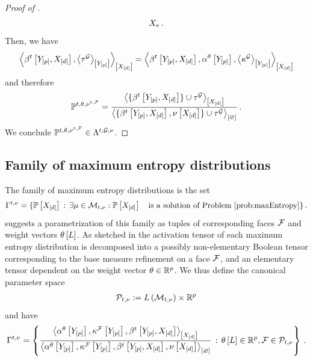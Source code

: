 \begin{proof}[Proof of ]
\begin{align*}
{        }{X_{e}} \, .
    \end{align*}
    Then, we have
    \begin{align*}
        \left\langle \beta^{t}\left[Y_{[p]},X_{[d]}\right],\left\langle \tau^{\mathcal{G}}\right\rangle_{\left[ Y_{[p]} \right]}\right\rangle_{\left[ X_{[d]} \right]}
        = \left\langle \beta^{t}\left[Y_{[p]},X_{[d]}\right],\alpha^\theta\left[Y_{[p]}\right],\left\langle \kappa^{\mathcal{G}}\right\rangle_{\left[ Y_{[p]} \right]}\right\rangle_{\left[ X_{[d]} \right]}
    \end{align*}
    and therefore
    \begin{align*}
        \mathbb{P}^{t,\theta,\nu^{t,\mathcal{F}}}
        = \frac{
            \left\langle \{\beta^{t}\left[Y_{[p]},X_{[d]}\right]\}\cup\tau^{\mathcal{G}}\right\rangle_{\left[ X_{[d]} \right]}
        }{
            \left\langle \{\beta^{t}\left[Y_{[p]},X_{[d]}\right],\nu\left[X_{[d]}\right]\}\cup\tau^{\mathcal{G}}\right\rangle_{\left[ \varnothing \right]}
        } \, .
    \end{align*}
    We conclude $\mathbb{P}^{t,\theta,\nu^{t,\mathcal{F}}}\in \Lambda^{t,\mathcal{G},\nu}$.
\end{proof}

\subsection{Family of maximum entropy distributions}


The family of maximum entropy distributions is the set
\begin{align*}
    \maxentfamilyof{\sstat}{\basemeasure} =
    \{\probwith \wcols \exists\meanparam\in\genmeanset : \probwith \quad\text{is a solution of \problemref{prob:maxEntropy}} \} \, .
\end{align*}
 suggests a parametrization of this family as tuples of corresponding faces $\mathcal{F}$ and weight vectors $\theta\left[L\right]$.
As sketched in  the activation tensor of each maximum entropy distribution is decomposed into a possibly non-elementary Boolean tensor corresponding to the base measure refinement on a face $\mathcal{F}$, and an elementary tensor dependent on the weight vector $\theta\in\mathbb{R}^{p}$.
We thus define the canonical parameter space
\begin{align*}
    \mathcal{P}_{t,\nu}
    := L\left(\mathcal{M}_{t,\nu}\right) \times \mathbb{R}^{p}
\end{align*}
and have
\begin{align*}
    \Gamma^{t,\nu} =
    \left\{
        \frac{
            \left\langle \alpha^\theta\left[Y_{[p]}\right],\kappa^{\mathcal{F}}\left[Y_{[p]}\right],\beta^{t}\left[Y_{[p]},X_{[d]}\right]\right\rangle_{\left[ X_{[d]} \right]}
        }{
            \left\langle \alpha^\theta\left[Y_{[p]}\right],\kappa^{\mathcal{F}}\left[Y_{[p]}\right],\beta^{t}\left[Y_{[p]},X_{[d]}\right],\nu\left[X_{[d]}\right]\right\rangle_{\left[ \varnothing \right]}
        }
        \,:\, \theta\left[L\right]\in\mathbb{R}^{p},\mathcal{F}\in\mathcal{P}_{t,\nu}
    \right\} \, .
\end{align*}

